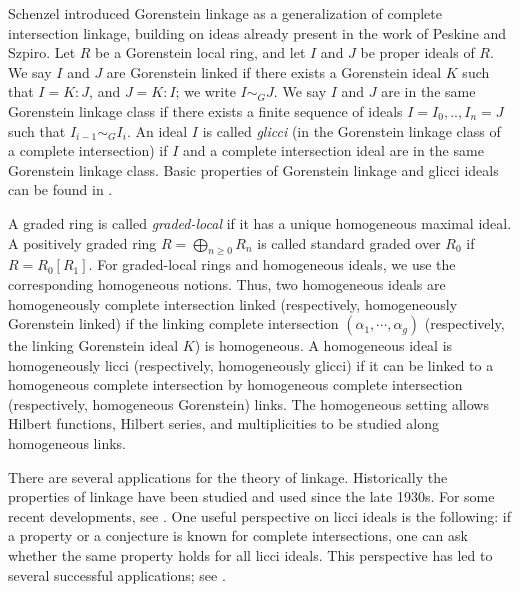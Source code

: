 \documentclass[11pt,letterpaper]{amsart}
\theoremstyle{plain}
\theoremstyle{definition}
\theoremstyle{remark}
\begin{document}
Schenzel \cite{schenzel1982notes} introduced Gorenstein linkage as a generalization of complete intersection linkage, building
on ideas already present in the work of Peskine and Szpiro. Let $R$ be a Gorenstein local ring, and let $I$ and $J$ be proper ideals of $R$. We say $I$ and $J$ are Gorenstein linked if there exists a Gorenstein ideal $K$ such that $I=K:J$, and $J=K:I$; we write $I\sim_G J$. We say $I$ and $J$ are in the same Gorenstein linkage class if there exists a finite sequence of ideals $I=I_0,..,I_n=J$ such that $I_{i-1}\sim_G I_{i}$.  An ideal $I$ is called \emph{glicci} (in the Gorenstein linkage class of a complete intersection) if $I$ and a complete intersection ideal are in the same Gorenstein linkage class. Basic properties of Gorenstein linkage and glicci ideals can be found in \cite{schenzel1982notes, kustin1984deformation,kleppe2001gorenstein,migliore2002liaison,migliore2013glicci}.

A graded ring is called \emph{graded-local} if it has a unique homogeneous maximal ideal. A positively graded ring
$R=\bigoplus_{n\geq0}R_n$ is called
standard graded over $R_0$ if
$R=R_0[R_1]$. For graded-local rings and homogeneous ideals, we use the corresponding homogeneous notions. Thus, two homogeneous ideals are homogeneously complete intersection linked (respectively, homogeneously Gorenstein linked) if the linking complete intersection $(\alpha_1,\cdots,\alpha_g)$ (respectively, the linking Gorenstein ideal $K$) is homogeneous. A homogeneous ideal is homogeneously licci (respectively, homogeneously glicci) if it can be linked to a homogeneous complete intersection by homogeneous complete intersection (respectively, homogeneous Gorenstein) links. The homogeneous setting allows Hilbert functions, Hilbert series, and multiplicities to be studied
along homogeneous links.

There are several applications for the theory of linkage. Historically the properties of linkage have been studied and used since the late 1930s. For some recent developments, see \cite{guerrieri2025grade, chmiel2025structure, chong2016application, christensen2019free, guerrieri2024ade, jelisiejew2026hilbert}. One useful perspective on licci
ideals is the following: if a property or a conjecture is known for complete intersections, one can ask whether the same property holds for all licci ideals. This perspective has led to several successful applications; see \cite{herzog1984differentials, ulrich1987vanishing, planas1996vanishing, johnson2022splitting, huneke1989powers, eisenbud1995evolutions}.
\end{document}
